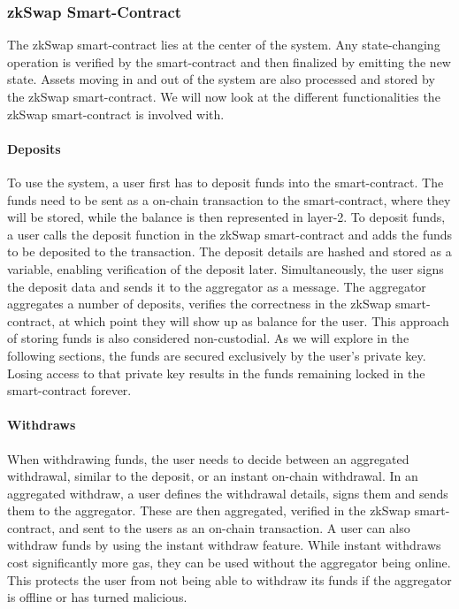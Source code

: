 \documentclass[../../thesis.tex]{subfiles}
\begin{document}
\subsubsection{zkSwap Smart-Contract}
The zkSwap smart-contract lies at the center of the system. Any state-changing operation is verified by the smart-contract and then finalized by emitting the new state. Assets moving in and out of the system are also processed and stored by the zkSwap smart-contract. We will now look at the different functionalities the zkSwap smart-contract is involved with. 

\paragraph{Deposits}
To use the system, a user first has to deposit funds into the smart-contract. The funds need to be sent as a on-chain transaction to the smart-contract, where they will be stored, while the balance is then represented in layer-2. To deposit funds, a user calls the deposit function in the zkSwap smart-contract and adds the funds to be deposited to the transaction. The deposit details are hashed and stored as a variable, enabling verification of the deposit later. Simultaneously, the user signs the deposit data and sends it to the aggregator as a message. The aggregator aggregates a number of deposits, verifies the correctness in the zkSwap smart-contract, at which point they will show up as balance for the user. This approach of storing funds is also considered non-custodial. As we will explore in the following sections, the funds are secured exclusively by the user's private key. Losing access to that private key results in the funds remaining locked in the smart-contract forever. 

\paragraph{Withdraws}
When withdrawing funds, the user needs to decide between an aggregated withdrawal, similar to the deposit, or an instant on-chain withdrawal. In an aggregated withdraw, a user defines the withdrawal details, signs them and sends them to the aggregator. These are then aggregated, verified in the zkSwap smart-contract, and sent to the users as an on-chain transaction. A user can also withdraw funds by using the instant withdraw feature. While instant withdraws cost significantly more gas, they can be used without the aggregator being online. This protects the user from not being able to withdraw its funds if the aggregator is offline or has turned malicious.
\end{document}
